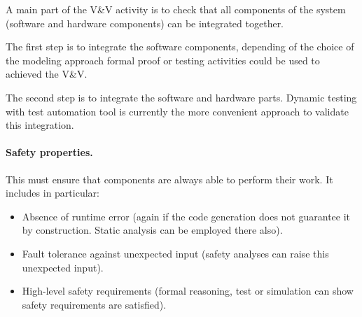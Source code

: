 \documentclass{template/openetcs_article}
\begin{document}
A main part of the V\&V activity is to check that all components of the system (software and hardware components) can be integrated together.

The first step  is to integrate the software components, depending of the choice of the modeling approach  formal proof or testing activities could be used to achieved the V\&V.

The second step is to  integrate the software and hardware parts. Dynamic
testing with test automation tool  is currently  the more convenient approach  to  validate this integration.


\paragraph{Safety properties.}

This must ensure that components are always able to perform their work.
It includes in particular:
\begin{itemize}
  \item Absence of runtime error (again if the code generation does
        not guarantee it by construction. Static analysis can be employed
        there also).
  \item Fault tolerance against unexpected input (safety analyses can raise this unexpected input).
  \item High-level safety requirements (formal reasoning, test or simulation can show safety requirements are satisfied).
\end{itemize}


\end{document}
